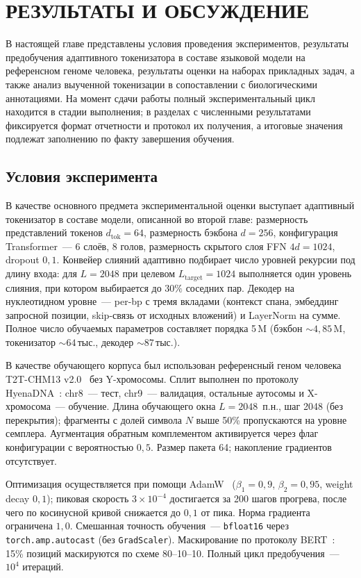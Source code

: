 \chapter{РЕЗУЛЬТАТЫ И ОБСУЖДЕНИЕ}

В настоящей главе представлены условия проведения экспериментов,
результаты предобучения адаптивного токенизатора в составе языковой
модели на референсном геноме человека, результаты оценки на наборах
прикладных задач, а также анализ выученной токенизации в сопоставлении
с биологическими аннотациями. На момент сдачи работы полный
экспериментальный цикл находится в стадии выполнения; в разделах с
численными результатами фиксируется формат отчетности и протокол их
получения, а итоговые значения подлежат заполнению по факту завершения
обучения.

\section{Условия эксперимента}

В качестве основного предмета экспериментальной оценки выступает
адаптивный токенизатор в составе модели, описанной во второй главе:
размерность представлений токенов $d_{\text{tok}} = 64$, размерность
бэкбона $d = 256$, конфигурация Transformer~--- 6 слоёв, 8 голов,
размерность скрытого слоя FFN $4d = 1024$, dropout $0{,}1$. Конвейер
слияний адаптивно подбирает число уровней рекурсии под длину входа:
для $L = 2048$ при целевом $L_{\text{target}} = 1024$ выполняется один
уровень слияния, при котором выбирается до $30\%$ соседних пар.
Декодер на нуклеотидном уровне~--- per-bp с тремя вкладами (контекст
спана, эмбеддинг запросной позиции, skip-связь от исходных вложений) и
LayerNorm на сумме. Полное число обучаемых параметров составляет
порядка 5\,M (бэкбон ${\sim}4{,}85$\,M, токенизатор ${\sim}64$\,тыс.,
декодер ${\sim}87$\,тыс.).

В качестве обучающего корпуса был использован референсный геном
человека T2T-CHM13
v2.0~\cite{nurgalievT2TCHm13CompleteHuman2022} без Y-хромосомы. Сплит
выполнен по протоколу
HyenaDNA~\cite{nguenHyenaDNALongRangeGenomic2024}: chr8~--- тест,
chr9~--- валидация, остальные аутосомы и X-хромосома~--- обучение.
Длина обучающего окна $L = 2048$~п.н., шаг 2048 (без перекрытия);
фрагменты с долей символа $N$ выше 50\% пропускаются на уровне
семплера. Аугментация обратным комплементом активируется через флаг
конфигурации с вероятностью $0{,}5$. Размер пакета 64; накопление
градиентов отсутствует.

Оптимизация осуществляется при помощи
AdamW~\cite{loshchilovDecoupledWeightDecay2019} ($\beta_1 = 0{,}9$,
$\beta_2 = 0{,}95$, weight decay $0{,}1$); пиковая скорость
$3 \times 10^{-4}$ достигается за 200 шагов прогрева, после чего по
косинусной кривой снижается до $0{,}1$ от пика. Норма градиента
ограничена $1{,}0$. Смешанная точность обучения~--- \texttt{bfloat16}
через \texttt{torch.amp.autocast} (без \texttt{GradScaler}). Маскирование
по протоколу BERT~\cite{devlinBERTPretrainingDeep2019}: 15\% позиций
маскируются по схеме 80--10--10. Полный цикл предобучения~--- $10^4$
итераций.

